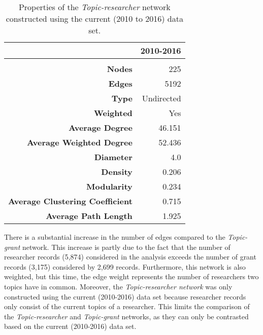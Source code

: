 \begin{table}[!htbp]
\centering
\caption[Properties of the \textit{Topic-researcher} network constructed using the current (2010 to 2016) data set]{Properties of the \textit{Topic-researcher} network constructed using the current (2010 to 2016) data set.}
\label{table:topic_b_properties}
\begin{tabular}{r|r}
{} & \textbf{2010-2016}\\
\hline\\
\textbf{Nodes}                          & {225}\\
\textbf{Edges}                          & {5192}\\
\textbf{Type}                           & {Undirected}\\
\textbf{Weighted}                       & {Yes}\\
\textbf{Average Degree}                 & {46.151}\\
\textbf{Average Weighted Degree}        & {52.436}\\
\textbf{Diameter}                       & {4.0}\\
\textbf{Density}                        & {0.206}\\
\textbf{Modularity}                     & {0.234}\\
\textbf{Average Clustering Coefficient} & {0.715}\\
\textbf{Average Path Length}            & {1.925}\\
\end{tabular}
\end{table}

There is a substantial increase in the number of edges compared to the \textit{Topic-grant} network. This increase is partly due to the fact that the number of researcher records (5,874) considered in the analysis exceeds the number of grant records (3,175) considered by 2,699 records. Furthermore, this network is also weighted, but this time, the edge weight represents the number of researchers two topics have in common. Moreover, the \textit{Topic-researcher network} was only constructed using the current (2010-2016) data set because researcher records only consist of the current topics of a researcher. This limits the comparison of the \textit{Topic-researcher} and \textit{Topic-grant} networks, as they can only be contrasted based on the current (2010-2016) data set.

